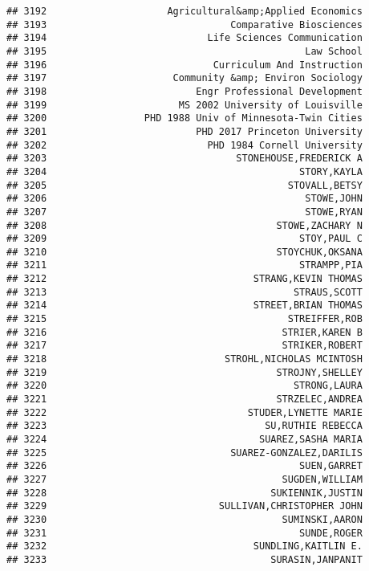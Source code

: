 \documentclass[
]{article}
\begin{document}
\begin{verbatim}
## 3192                     Agricultural&amp;Applied Economics
## 3193                                Comparative Biosciences
## 3194                            Life Sciences Communication
## 3195                                             Law School
## 3196                             Curriculum And Instruction
## 3197                      Community &amp; Environ Sociology
## 3198                          Engr Professional Development
## 3199                       MS 2002 University of Louisville
## 3200                 PHD 1988 Univ of Minnesota-Twin Cities
## 3201                          PHD 2017 Princeton University
## 3202                            PHD 1984 Cornell University
## 3203                                 STONEHOUSE,FREDERICK A
## 3204                                            STORY,KAYLA
## 3205                                          STOVALL,BETSY
## 3206                                             STOWE,JOHN
## 3207                                             STOWE,RYAN
## 3208                                        STOWE,ZACHARY N
## 3209                                            STOY,PAUL C
## 3210                                        STOYCHUK,OKSANA
## 3211                                            STRAMPP,PIA
## 3212                                    STRANG,KEVIN THOMAS
## 3213                                           STRAUS,SCOTT
## 3214                                    STREET,BRIAN THOMAS
## 3215                                          STREIFFER,ROB
## 3216                                         STRIER,KAREN B
## 3217                                         STRIKER,ROBERT
## 3218                               STROHL,NICHOLAS MCINTOSH
## 3219                                        STROJNY,SHELLEY
## 3220                                           STRONG,LAURA
## 3221                                        STRZELEC,ANDREA
## 3222                                   STUDER,LYNETTE MARIE
## 3223                                      SU,RUTHIE REBECCA
## 3224                                     SUAREZ,SASHA MARIA
## 3225                                SUAREZ-GONZALEZ,DARILIS
## 3226                                            SUEN,GARRET
## 3227                                         SUGDEN,WILLIAM
## 3228                                       SUKIENNIK,JUSTIN
## 3229                              SULLIVAN,CHRISTOPHER JOHN
## 3230                                         SUMINSKI,AARON
## 3231                                            SUNDE,ROGER
## 3232                                    SUNDLING,KAITLIN E.
## 3233                                       SURASIN,JANPANIT

\end{verbatim}
\end{document}
